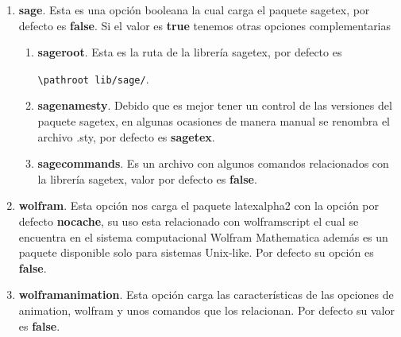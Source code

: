 {\begin{enumerate}
		\item \textbf{sage}. Esta es una opción booleana la cual carga el paquete sagetex, por defecto es \textbf{false}. Si el valor es \textbf{true} tenemos otras opciones complementarias
		\begin{enumerate}
			\item \textbf{sageroot}.
			Esta es la ruta de la librería sagetex, por defecto es 
			\begin{center}
				\verb|\pathroot lib/sage/|.
			\end{center}
			\item \textbf{sagenamesty}. Debido que es mejor tener un control de las versiones del paquete sagetex, en algunas ocasiones de manera manual se renombra el archivo .sty, por defecto es \textbf{sagetex}.
			\item \textbf{sagecommands}. Es un archivo con algunos comandos relacionados con la librería sagetex, valor por defecto es \textbf{false}.
		\end{enumerate}
		\item \textbf{wolfram}. Esta opción nos carga el paquete latexalpha2 con la opción por defecto \textbf{nocache}, su uso esta relacionado con wolframscript el cual se encuentra en el sistema computacional Wolfram Mathematica además es un paquete disponible solo para sistemas Unix-like. Por defecto su opción es \textbf{false}.
		\item \textbf{wolframanimation}. Esta opción carga las características de las opciones de animation, wolfram y unos comandos que los relacionan. Por defecto su valor es \textbf{false}.
	\end{enumerate}
}
